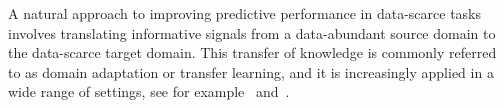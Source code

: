 \documentclass{article}
\newcommand{\jb}[1]{{\textcolor{brown}{[\textbf{JB:} #1]}}}
\begin{document}
    A natural approach to improving predictive performance in data-scarce tasks involves translating informative signals from a data-abundant source domain to the data-scarce target domain. This transfer of knowledge is commonly referred to as domain adaptation or transfer learning, and it is increasingly applied in a wide range of settings, see for example~\citet{ref:wilson2020survey, ref:chu-wang-2018-survey, ref:weiss2016survey} and~\citet{ref:redko2019advances}. %

    
    
    
    
\end{document}
